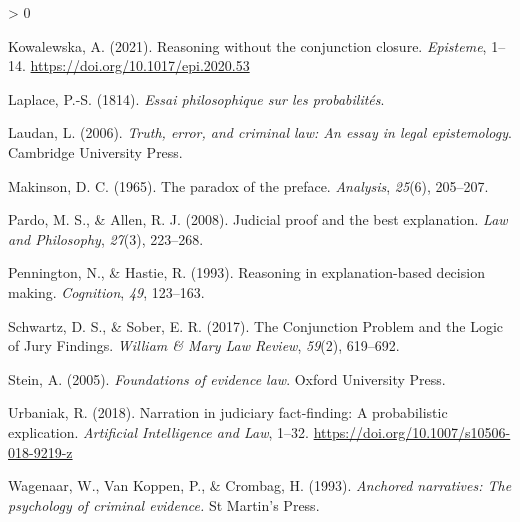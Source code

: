 \documentclass[
  10pt,
  dvipsnames,enabledeprecatedfontcommands]{scrartcl}
\newlength{\cslhangindent}
\newenvironment{CSLReferences}[2] %
 {%
  \setlength{\parindent}{0pt}
  \ifodd #1 \everypar{\setlength{\hangindent}{\cslhangindent}}\ignorespaces\fi
  \ifnum #2 > 0
  \setlength{\parskip}{#2\baselineskip}
  \fi
 }%
 {}
\begin{document}
\begin{CSLReferences}{1}{0}
\leavevmode\hypertarget{ref-Kowalewska2021conjunction}{}%
Kowalewska, A. (2021). Reasoning without the conjunction closure.
\emph{Episteme}, 1--14. \url{https://doi.org/10.1017/epi.2020.53}

\leavevmode\hypertarget{ref-Laplace1814}{}%
Laplace, P.-S. (1814). \emph{Essai philosophique sur les probabilités}.

\leavevmode\hypertarget{ref-laudan2006truth}{}%
Laudan, L. (2006). \emph{Truth, error, and criminal law: An essay in
legal epistemology}. Cambridge University Press.

\leavevmode\hypertarget{ref-Makinson1965-MAKTPO-2}{}%
Makinson, D. C. (1965). The paradox of the preface. \emph{Analysis},
\emph{25}(6), 205--207.

\leavevmode\hypertarget{ref-Pardo2008judicial}{}%
Pardo, M. S., \& Allen, R. J. (2008). Judicial proof and the best
explanation. \emph{Law and Philosophy}, \emph{27}(3), 223--268.

\leavevmode\hypertarget{ref-penn1993}{}%
Pennington, N., \& Hastie, R. (1993). Reasoning in explanation-based
decision making. \emph{Cognition}, \emph{49}, 123--163.

\leavevmode\hypertarget{ref-schwartz2017ConjunctionProblemLogic}{}%
Schwartz, D. S., \& Sober, E. R. (2017). The {Conjunction Problem} and
the {Logic} of {Jury Findings}. \emph{William \& Mary Law Review},
\emph{59}(2), 619--692.

\leavevmode\hypertarget{ref-Stein05}{}%
Stein, A. (2005). \emph{Foundations of evidence law}. Oxford University
Press.

\leavevmode\hypertarget{ref-urbaniak2018narration}{}%
Urbaniak, R. (2018). Narration in judiciary fact-finding: A
probabilistic explication. \emph{Artificial Intelligence and Law},
1--32. \url{https://doi.org/10.1007/s10506-018-9219-z}

\leavevmode\hypertarget{ref-wagenaar1993anchored}{}%
Wagenaar, W., Van Koppen, P., \& Crombag, H. (1993). \emph{Anchored
narratives: The psychology of criminal evidence.} St Martin's Press.

\end{CSLReferences}
\end{document}
